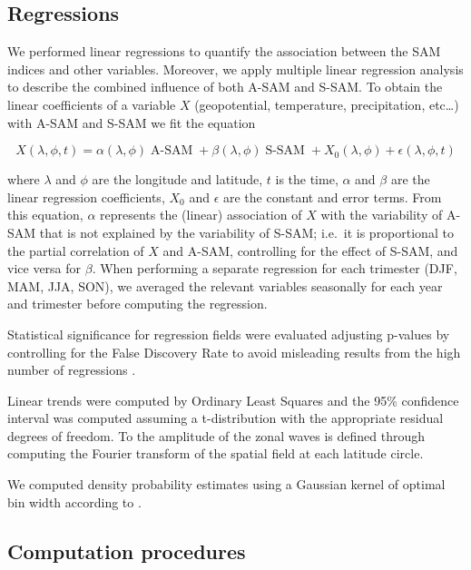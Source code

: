 \documentclass[smallextended]{svjour3}       %
\begin{document}
\hypertarget{regressions}{%
\subsection{Regressions}\label{regressions}}

We performed linear regressions to quantify the association between the SAM indices and other variables.
Moreover, we apply multiple linear regression analysis to describe the combined influence of both A\nobreakdash-SAM and S\nobreakdash-SAM.
To obtain the linear coefficients of a variable \(X\) (geopotential, temperature, precipitation, etc\ldots) with A\nobreakdash-SAM and S\nobreakdash-SAM we fit the equation

\[
X(\lambda, \phi, t) = \alpha(\lambda, \phi) \operatorname{A-SAM} + \beta(\lambda, \phi) \operatorname{S-SAM} + X_0(\lambda, \phi) +  \epsilon(\lambda, \phi, t)
\]

where \(\lambda\) and \(\phi\) are the longitude and latitude, \(t\) is the time, \(\alpha\) and \(\beta\) are the linear regression coefficients, \(X_0\) and \(\epsilon\) are the constant and error terms.
From this equation, \(\alpha\) represents the (linear) association of \(X\) with the variability of A\nobreakdash-SAM that is not explained by the variability of S\nobreakdash-SAM; i.e.~it is proportional to the partial correlation of \(X\) and A\nobreakdash-SAM, controlling for the effect of S\nobreakdash-SAM, and vice versa for \(\beta\).
When performing a separate regression for each trimester (DJF, MAM, JJA, SON), we averaged the relevant variables seasonally for each year and trimester before computing the regression.

Statistical significance for regression fields were evaluated adjusting p-values by controlling for the False Discovery Rate \citep{benjamini1995, wilks2016} to avoid misleading results from the high number of regressions \citep{walker1914, katz1991}.

Linear trends were computed by Ordinary Least Squares and the 95\% confidence interval was computed assuming a t-distribution with the appropriate residual degrees of freedom.
To the amplitude of the zonal waves is defined through computing the Fourier transform of the spatial field at each latitude circle.

We computed density probability estimates using a Gaussian kernel of optimal bin width according to \citet{sheather1991}.

\hypertarget{computation-procedures}{%
\subsection{Computation procedures}\label{computation-procedures}}
\end{document}
